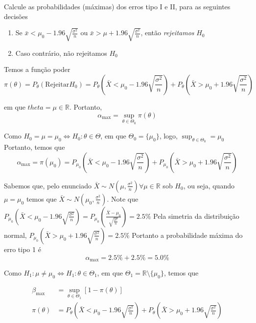 \documentclass[
  letterpaper,
  DIV=11,
  numbers=noendperiod]{scrreprt}
\providecommand{\tightlist}{%
  \setlength{\itemsep}{0pt}\setlength{\parskip}{0pt}}\usepackage{longtable,booktabs,array}
\begin{document}
Calcule as probabilidades (máximas) dos erros tipo I e II, para as
seguintes decisões

\begin{enumerate}
\def\labelenumi{\arabic{enumi}.}
\tightlist
\item
  Se \(\bar{x} < \mu_{0} - 1.96\sqrt{\frac{\sigma^2}{n}}\) ou
  \(\bar{x} > \mu+1.96 \sqrt{ \frac{\sigma^2}{n} }\), então
  \emph{rejeitamos} \(H_{0}\)
\item
  Caso contrário, não rejeitamos \(H_0\)
\end{enumerate}

Temos a função poder \[
\pi(\theta) = P_{\theta}(\mathrm{Rejeitar} H_{0}) = P_{\theta}\left(\bar{X}<\mu_{0} - 1.96 \sqrt{\frac{\sigma^2}{n}}\right)
+P_{\theta}\left( \bar{X} > \mu_{0} + 1.96 \sqrt{  \frac{\sigma^2}{n} } \right)
\]

em que \(theta = \mu \in \mathbb{R}\). Portanto, \[
\alpha_{\max} = \sup_{\theta \in \Theta_{0}} \pi(\theta)
\]

Como \(H_{0}=\mu=\mu_{0} \Leftrightarrow H_{0}: \theta \in \Theta\), em
que \(\Theta_{0}=\{ \mu_{0} \}\), logo,
\(\sup_{\theta \in \Theta_{0}} = \mu_{0}\) Portanto, temos que \[
\alpha_{\max} = \pi(\mu_{0}) = P_{\mu_{0}}\left( \bar{X}<\mu_{0}-1.96\sqrt{ \frac{\sigma^2}{n} } \right) +
P_{\mu_{0}}\left( \bar{X}>\mu_{0} + 1.96 \sqrt{  \frac{\sigma^2}{n} } \right)
\]

Sabemos que, pelo enunciado
\(\bar{X} \sim N\left( \mu, \frac{\sigma^2}{n} \right) \forall \mu \in \mathbb{R}\)
sob \(H_{0}\), ou seja, quando \(\mu= \mu_{0}\) temos que
\(\bar{X}\sim N\left( \mu_{0}, \frac{\sigma^2}{n} \right)\). Note que
\(P_{\mu_{0}}\left( \bar{X}<\mu_{0}-1.96 \sqrt{ \frac{\sigma^2}{n} } \right) =
P_{\mu_{0}}\left(\frac{\bar{X}-\mu_{0}}{\sqrt{ \frac{\sigma^2}{n} }} \right) = 2.5\%\)
Pela simetria da distribuição normal,
\(P_{\mu_{0}}\left( \bar{X}>\mu_{0}+1.96 \sqrt{ \frac{\sigma^2}{n} } \right) = 2.5\%\)
Portanto a probabilidade máxima do erro tipo 1 é \[
\alpha_{\max} = 2.5\% + 2.5\% = 5.0\%
\]

Como
\(H_{1}: \mu \neq \mu_{0} \Leftrightarrow H_{1}: \theta \in \Theta_{1}\),
em que \(\Theta_{1} = \mathbb{R} \setminus \{\mu_{0}\}\), temos que

\[
\begin{aligned}
\beta_{\max} &= \sup_{\theta \in \Theta_{1}}[1-\pi(\theta)] \\
\pi(\theta) &= P_{\theta}\left( \bar{X} < \mu_{0} - 1.96 \sqrt{\frac{\sigma^2}{n}} \right) +
P_{\theta}\left(\bar{X}>\mu_{0}+1.96\sqrt{\frac{\sigma^2}{n}}\right)
\end{aligned}
\]
\end{document}
